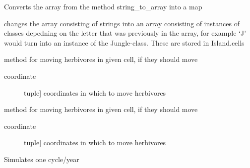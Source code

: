\documentclass[a4paper,10pt,english]{sphinxmanual}
\begin{document}
\begin{fulllineitems}
\begin{fulllineitems}
\label{\detokenize{island:biosim.island.Island.array_to_island}}
Converts the array from the method string\_to\_array into a map

changes the array consisting of strings into an array consisting of
instances of classes depedning on the letter that was previously in
the array, for example `J' would turn into an instance of the
Jungle-class. These are stored in Island.cells

\end{fulllineitems}


\begin{fulllineitems}
\label{\detokenize{island:biosim.island.Island.cell_move_carnivores}}
method for moving herbivores in given cell, if they should move
\begin{description}
\item[{coordinate}] \leavevmode{[}tuple{]}
coordinates in which to move herbivores

\end{description}

\end{fulllineitems}


\begin{fulllineitems}
\label{\detokenize{island:biosim.island.Island.cell_move_herbivores}}
method for moving herbivores in given cell, if they should move
\begin{description}
\item[{coordinate}] \leavevmode{[}tuple{]}
coordinates in which to move herbivores

\end{description}

\end{fulllineitems}


\begin{fulllineitems}
\label{\detokenize{island:biosim.island.Island.cycle}}
Simulates one cycle/year


\end{fulllineitems}
\end{fulllineitems}
\end{document}
